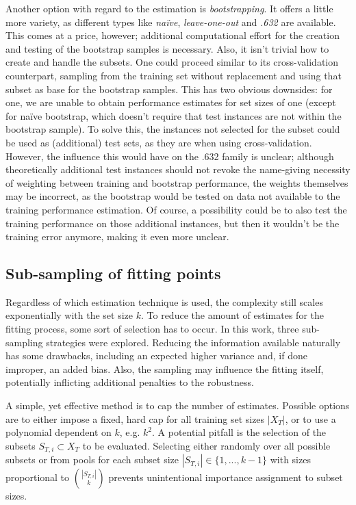 Another option with regard to the estimation is \textit{bootstrapping}. It offers a little more variety, as different types like \textit{na\"{i}ve}, \textit{leave-one-out} and \textit{.632} are available. This comes at a price, however; additional computational effort for the creation and testing of the bootstrap samples is necessary. Also, it isn't trivial how to create and handle the subsets. One could proceed similar to its cross-validation counterpart, sampling from the training set without replacement and using that subset as base for the bootstrap samples. This has two obvious downsides: for one, we are unable to obtain performance estimates for set sizes of one (except for na\"{i}ve bootstrap, which doesn't require that test instances are not within the bootstrap sample). To solve this, the instances not selected for the subset could be used as (additional) test sets, as they are when using cross-validation. However, the influence this would have on the .632 family is unclear; although theoretically additional test instances should not revoke the name-giving necessity of weighting between training and bootstrap performance, the weights themselves may be incorrect, as the bootstrap would be tested on data not available to the training performance estimation. Of course, a possibility could be to also test the training performance on those additional instances, but then it wouldn't be the training error anymore, making it even more unclear.

\subsection{Sub-sampling of fitting points}
Regardless of which estimation technique is used, the complexity still scales exponentially with the set size $k$. To reduce the amount of estimates for the fitting process, some sort of selection has to occur. In this work, three sub-sampling strategies were explored. Reducing the information available naturally has some drawbacks, including an expected higher variance and, if done improper, an added bias. Also, the sampling may influence the fitting itself, potentially inflicting additional penalties to the robustness.

A simple, yet effective method is to cap the number of estimates. Possible options are to either impose a fixed, hard cap for all training set sizes $|X_T|$, or to use a polynomial dependent on $k$, e.g. $k^2$. A potential pitfall is the selection of the subsets $S_{T,i} \subset X_T$ to be evaluated. Selecting either randomly over all possible subsets or from pools for each subset size $|S_{T,i}| \in \{1,...,k-1\}$ with sizes proportional to $|S_{T,i}| \choose k$ prevents unintentional importance assignment to subset sizes.

